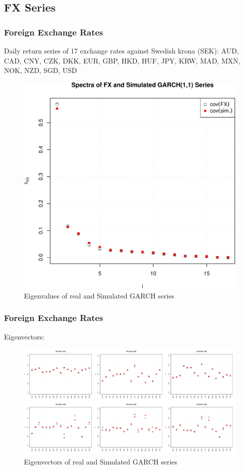 \documentclass{beamer}
\begin{document}
\subsection{FX Series}
\begin{frame}
  \frametitle{Foreign Exchange Rates}
  Daily return series of 17 exchange rates against Swedish krona (SEK):
  AUD,
  CAD,
  CNY,
  CZK,
  DKK,
  EUR,
  GBP,
  HKD,
  HUF,
  JPY,
  KRW,
  MAD,
  MXN,
  NOK,
  NZD,
  SGD,
  USD
  \begin{figure}[htb!]
    \centering
    \includegraphics[scale=0.35]{FX_eigenvalues.pdf}
    \caption{\scriptsize Eigenvalues of real and Simulated GARCH series}
  \end{figure}
\end{frame}

\begin{frame}
  \frametitle{Foreign Exchange Rates}
  Eigenvectors:
  \begin{figure}[htb!]
    \centering
    \includegraphics[scale=0.2]{FX_eigenvectors.pdf}
    \caption{\scriptsize Eigenvectors of real and Simulated GARCH series}
  \end{figure}
\end{frame}
\end{document}
